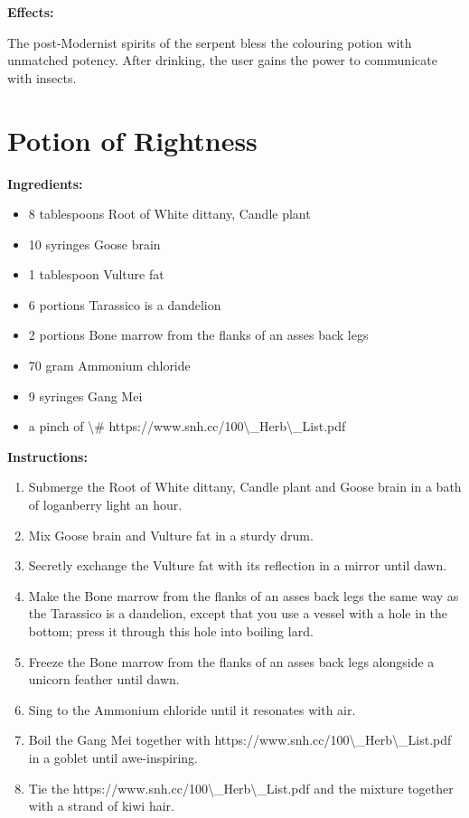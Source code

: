 \documentclass{article}
\begin{document}
\textbf{Effects:}

The post-Modernist spirits of the serpent bless the colouring potion with unmatched potency. After drinking, the user gains the power to communicate with insects.

\newpage
\section*{Potion of Rightness}

\textbf{Ingredients:}

\begin{itemize}
  \item 8 tablespoons Root of White dittany, Candle plant
  \item 10 syringes Goose brain
  \item 1 tablespoon Vulture fat
  \item 6 portions Tarassico is a dandelion
  \item 2 portions Bone marrow from the flanks of an asses back legs
  \item 70 gram Ammonium chloride
  \item 9 syringes Gang Mei
  \item a pinch of \textbackslash{}# https://www.snh.cc/100\textbackslash{}_Herb\textbackslash{}_List.pdf
\end{itemize}

\textbf{Instructions:}

\begin{enumerate}
  \item Submerge the Root of White dittany, Candle plant and Goose brain in a bath of loganberry light an hour.
  \item Mix Goose brain and Vulture fat in a sturdy drum.
  \item Secretly exchange the Vulture fat with its reflection in a mirror until dawn.
  \item Make the Bone marrow from the flanks of an asses back legs the same way as the Tarassico is a dandelion, except that you use a vessel with a hole in the bottom; press it through this hole into boiling lard.
  \item Freeze the Bone marrow from the flanks of an asses back legs alongside a unicorn feather until dawn.
  \item Sing to the Ammonium chloride until it resonates with air.
  \item Boil the Gang Mei together with  https://www.snh.cc/100\textbackslash{}_Herb\textbackslash{}_List.pdf in a goblet until awe-inspiring.
  \item Tie the  https://www.snh.cc/100\textbackslash{}_Herb\textbackslash{}_List.pdf and the mixture together with a strand of kiwi hair.
\end{enumerate}
\end{document}

